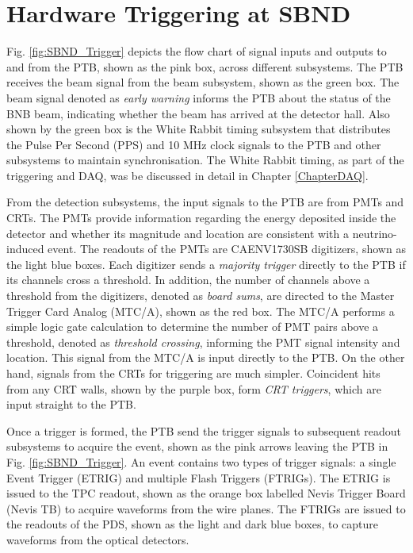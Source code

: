 
\chapter{Hardware Triggering at SBND} 
\label{appendix_hardware_trigger}
\ifpdf
    \graphicspath{{Appendix1/Figs/Raster/}{Appendix1/Figs/PDF/}{Appendix1/Figs/}}
\else
    \graphicspath{{Appendix1/Figs/Vector/}{Appendix1/Figs/}}
\fi

Fig. \ref{fig:SBND_Trigger} depicts the flow chart of signal inputs and outputs to and from the PTB, shown as the pink box, across different subsystems.  
The PTB receives the beam signal from the beam subsystem, shown as the green box.
The beam signal denoted as \textit{early warning} informs the PTB about the status of the BNB beam, indicating whether the beam has arrived at the detector hall.
Also shown by the green box is the White Rabbit timing subsystem that distributes the Pulse Per Second (PPS) and 10 MHz clock signals to the PTB and other subsystems to maintain synchronisation.
The White Rabbit timing, as part of the triggering and DAQ, was be discussed in detail in Chapter \ref{ChapterDAQ}.

From the detection subsystems, the input signals to the PTB are from PMTs and CRTs.
The PMTs provide information regarding the energy deposited inside the detector and whether its magnitude and location are consistent with a neutrino-induced event.
The readouts of the PMTs are CAENV1730SB digitizers, shown as the light blue boxes.
Each digitizer sends a \textit{majority trigger} directly to the PTB if its channels cross a threshold.
In addition, the number of channels above a threshold from the digitizers, denoted as \textit{board sums}, are directed to the Master Trigger Card Analog (MTC/A), shown as the red box.    
The MTC/A performs a simple logic gate calculation to determine the number of PMT pairs above a threshold, denoted as \textit{threshold crossing}, informing the PMT signal intensity and location.
This signal from the MTC/A is input directly to the PTB.  
On the other hand, signals from the CRTs for triggering are much simpler.
Coincident hits from any CRT walls, shown by the purple box, form \textit{CRT triggers}, which are input straight to the PTB.

Once a trigger is formed, the PTB send the trigger signals to subsequent readout subsystems to acquire the event, shown as the pink arrows leaving the PTB in Fig. \ref{fig:SBND_Trigger}.
An event contains two types of trigger signals: a single Event Trigger (ETRIG) and multiple Flash Triggers (FTRIGs).
The ETRIG is issued to the TPC readout, shown as the orange box labelled Nevis Trigger Board (Nevis TB) to acquire waveforms from the wire planes.
The FTRIGs are issued to the readouts of the PDS, shown as the light and dark blue boxes, to capture waveforms from the optical detectors.


